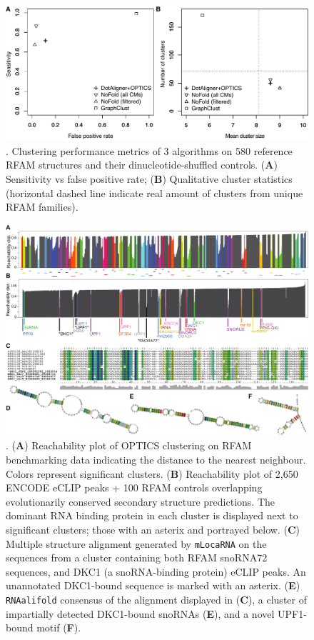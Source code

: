 \documentclass{bmcart}
\begin{document}
\begin{backmatter}
\begin{figure}[h!]
 \includegraphics[width=\textwidth]{fig4}
 \caption {. Clustering performance metrics of 3 algorithms on 580 reference RFAM 
 structures and their dinucleotide-shuffled controls. (\textbf{A}) Sensitivity vs false positive rate; (\textbf{B}) Qualitative cluster statistics (horizontal dashed line indicate real amount of clusters from unique RFAM families). }
\end{figure}


\begin{figure}[h!]
 \includegraphics[width=\textwidth]{fig5}
 \caption {. 
 (\textbf{A}) Reachability plot of OPTICS clustering on RFAM benchmarking data indicating the distance to the nearest neighbour. Colors represent 
 significant clusters. 
 (\textbf{B}) Reachability plot of 2,650 ENCODE eCLIP peaks + 100 RFAM controls overlapping evolutionarily conserved secondary structure predictions. The dominant RNA binding protein 
 in each cluster is displayed next to significant clusters; those with an asterix and portrayed below.
 (\textbf{C}) Multiple structure alignment generated by \texttt{mLocaRNA} on the sequences from a 
 cluster containing both RFAM snoRNA72 sequences, and DKC1 (a snoRNA-binding protein) eCLIP peaks. 
An unannotated DKC1-bound sequence is marked with an asterix.
(\textbf{E}) \texttt{RNAalifold} consensus of the alignment displayed in (\textbf{C}), 
a cluster of impartially detected DKC1-bound snoRNAs (\textbf{E}), 
and a novel UPF1-bound motif (\textbf{F}). }
\end{figure}



\end{backmatter}
\end{document}
